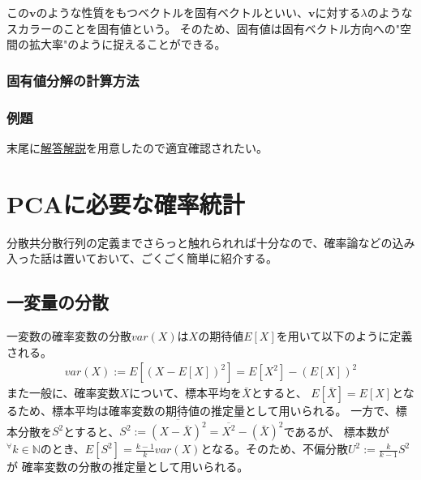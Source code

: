 \documentclass[10pt]{ujarticle}
\begin{document}
この$\mathbf{v}$のような性質をもつベクトルを固有ベクトルといい、$\mathbf{v}$に対する$\lambda$のようなスカラーのことを固有値という。
そのため、固有値は固有ベクトル方向への"空間の拡大率"のように捉えることができる。

\subsubsection{固有値分解の計算方法}
\subsubsection{例題}
末尾に\hyperlink{q2}{解答解説}を用意したので適宜確認されたい。

\section{PCAに必要な確率統計}
分散共分散行列の定義までさらっと触れられれば十分なので、確率論などの込み入った話は置いておいて、ごくごく簡単に紹介する。

\subsection{一変量の分散}
一変数の確率変数の分散$var(X)$は$X$の期待値$E[X]$を用いて以下のように定義される。
$$
\begin{aligned}
  var(X):=E[(X-E[X])^2]=E[X^2]-(E[X])^2
\end{aligned}
$$
また一般に、確率変数$X$について、標本平均を$\bar{X}$とすると、
$E[\bar{X}]=E[X]$となるため、標本平均は確率変数の期待値の推定量として用いられる。
一方で、標本分散を$S^2$とすると、$S^2:=\overline{(X-\bar{X})^2}=\overline{X^2}-(\bar{X})^2$であるが、
標本数が$^\forall k\in\mathbb{N}$のとき、$E[S^2]=\frac{k-1}{k}var(X)$となる。そのため、不偏分散$U^2:=\frac{k}{k-1}S^2$が
確率変数の分散の推定量として用いられる。
\end{document}
